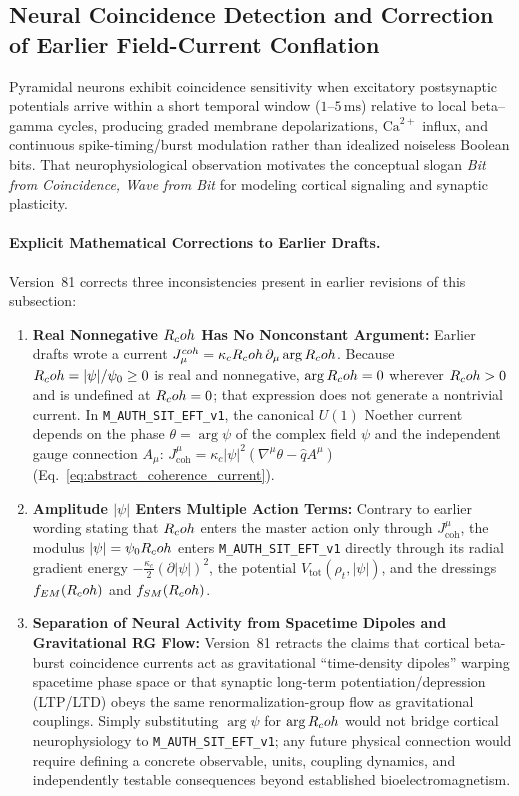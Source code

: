 \subsection{Neural Coincidence Detection and Correction of Earlier Field-Current Conflation}
\label{sec:neural_coherence}

Pyramidal neurons exhibit coincidence sensitivity when excitatory postsynaptic potentials arrive within a short temporal window ($1\text{--}5\,\mathrm{ms}$) relative to local beta--gamma cycles, producing graded membrane depolarizations, $\mathrm{Ca}^{2+}$ influx, and continuous spike-timing/burst modulation rather than idealized noiseless Boolean bits. That neurophysiological observation motivates the conceptual slogan \emph{Bit from Coincidence, Wave from Bit} for modeling cortical signaling and synaptic plasticity.

\paragraph{Explicit Mathematical Corrections to Earlier Drafts.}
Version~81 corrects three inconsistencies present in earlier revisions of this subsection:
\begin{enumerate}[leftmargin=2em]
  \item \textbf{Real Nonnegative $R_coh$ Has No Nonconstant Argument:} Earlier drafts wrote a current $J_\mu^{coh} = \kappa_c R_coh\,\partial_\mu\arg R_coh$. Because $R_coh = |\psi|/\psi_0 \ge 0$ is real and nonnegative, $\arg R_coh = 0$ wherever $R_coh > 0$ and is undefined at $R_coh = 0$; that expression does not generate a nontrivial current. In \texttt{M\_AUTH\_SIT\_EFT\_v1}, the canonical $U(1)$ Noether current depends on the phase $\theta = \arg\psi$ of the complex field $\psi$ and the independent gauge connection $A_\mu$: $J^\mu_{\mathrm{coh}} = \kappa_c|\psi|^2(\nabla^\mu\theta - \hat{q}A^\mu)$ (Eq.~\eqref{eq:abstract_coherence_current}).
  \item \textbf{Amplitude $|\psi|$ Enters Multiple Action Terms:} Contrary to earlier wording stating that $R_coh$ enters the master action only through $J^\mu_{\mathrm{coh}}$, the modulus $|\psi| = \psi_0R_coh$ enters \texttt{M\_AUTH\_SIT\_EFT\_v1} directly through its radial gradient energy $-\frac{\kappa_c}{2}(\partial|\psi|)^2$, the potential $V_{\mathrm{tot}}(\rho_t, |\psi|)$, and the dressings $f_{EM}(R_coh)$ and $f_{SM}(R_coh)$.
  \item \textbf{Separation of Neural Activity from Spacetime Dipoles and Gravitational RG Flow:} Version~81 retracts the claims that cortical beta-burst coincidence currents act as gravitational ``time-density dipoles'' warping spacetime phase space or that synaptic long-term potentiation/depression (LTP/LTD) obeys the same renormalization-group flow as gravitational couplings. Simply substituting $\arg\psi$ for $\arg R_coh$ would not bridge cortical neurophysiology to \texttt{M\_AUTH\_SIT\_EFT\_v1}; any future physical connection would require defining a concrete observable, units, coupling dynamics, and independently testable consequences beyond established bioelectromagnetism.
\end{enumerate}

